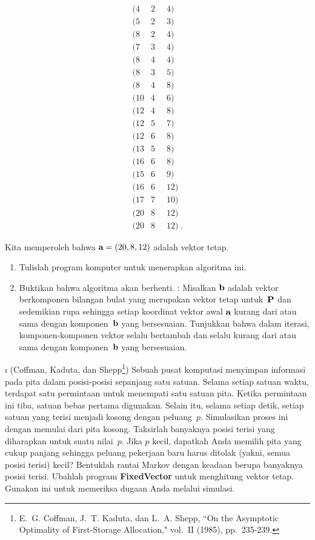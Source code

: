 \begin{LJSItem}
\begin{table}
\centering
$$\begin{array}{lll}
(4 & 2\;\; & 4)\\
(5 & 2 & 3)\\
(8 & 2 & 4)\\
(7 & 3 & 4)\\
(8 & 4 & 4)\\
(8 & 3 & 5)\\
(8 & 4 & 8)\\
(10 & 4 & 6)\\
(12 & 4 & 8)\\
(12 & 5 & 7)\\
(12 & 6 & 8)\\
(13 & 5 & 8)\\
(16 & 6 & 8)\\
(15 & 6 & 9)\\
(16 & 6 & 12)\\
(17 & 7 & 10)\\
(20 & 8 & 12)\\
(20 & 8 & 12)\ .
\end{array}
$$
\caption{Distribusi keping.}
\label{table 11.4}
\end{table}
Kita memperoleh bahwa ${\mbox{\bf a}\/} = (20,8,12)$ adalah vektor tetap.

\begin{enumerate}
\item Tulislah program komputer untuk menerapkan algoritma ini.

\item Buktikan bahwa algoritma akan berhenti. : Misalkan
${\mbox{\bf b}\/}$ adalah vektor berkomponen bilangan bulat yang merupakan vektor tetap
untuk~${\mbox{\bf P}\/}$ dan sedemikian rupa sehingga setiap koordinat vektor awal
${\mbox{\bf a}\/}$ kurang dari atau sama dengan komponen~${\mbox{\bf b}\/}$ yang bersesuaian.
Tunjukkan bahwa dalam iterasi, komponen-komponen vektor selalu bertambah dan
selalu kurang dari atau sama dengan komponen~${\mbox{\bf b}\/}$ yang bersesuaian.
\end{enumerate}

\i\label{exer 11.3.29} (Coffman, Kaduta, dan Shepp\footnote{E.~G. Coffman, 
J.~T. Kaduta, dan L.~A. Shepp, ``On the Asymptotic Optimality of
First-Storage
Allocation,"  vol.~II (1985),
pp.~235-239.}) Sebuah pusat komputasi menyimpan informasi pada pita dalam
posisi-posisi sepanjang satu satuan. Selama setiap satuan waktu, terdapat satu
permintaan untuk menempati satu satuan pita. Ketika permintaan ini tiba, satuan
bebas pertama digunakan. Selain itu, selama setiap detik, setiap satuan yang
terisi menjadi kosong dengan peluang~$p$. Simulasikan proses ini dengan memulai
dari pita kosong. Taksirlah banyaknya posisi terisi yang diharapkan untuk suatu
nilai~$p$. Jika $p$ kecil, dapatkah Anda memilih pita yang cukup panjang
sehingga peluang pekerjaan baru harus ditolak (yakni, semua posisi terisi)
kecil? Bentuklah rantai Markov dengan keadaan berupa banyaknya posisi terisi.
Ubahlah program {\bf FixedVector} untuk menghitung vektor tetap. Gunakan ini
untuk memeriksa dugaan Anda melalui simulasi.


\end{LJSItem}
